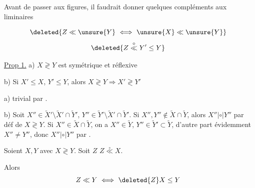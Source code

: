 
Avant de passer aux figures, il faudrait donner quelques compléments aux  liminaires


\[
\deleted{Z\ll\unsure{Y}\ \Longleftrightarrow\ \unsure{X}\ll\unsure{Y}}
\]
\[
\deleted{Z\overset{\circ}{\ll}Y'\leq Y}
\]
\noindent{}

\uline{Prop 1.} a) $X\gtrless Y$ est symétrique et réflexive

b) Si $X'\leq X$, $Y'\leq Y$, alors $X\gtrless Y\Longrightarrow X'\gtrless Y'$

 a)  trivial par .

b) Soit $X''\in\widetilde X'\setminus\widetilde X'\cap\widetilde Y'$, $Y''\in\widetilde Y'\setminus\widetilde X'\cap\widetilde Y'$.  Si $X'',Y''\notin\widetilde X\cap\widetilde Y$, alors $X''\mathrel{|\circ|}Y''$ par déf de $X\gtrless Y$. Si $X''\in\widetilde X\cap\widetilde Y$, on a $X''\in\widetilde Y$, $Y''\in\widetilde Y'\subset\widetilde Y$, d'autre part évidemment $X''\neq Y''$, donc $X''\mathrel{|\circ|}Y''$ par .


 Soient $X,Y$ avec $X\gtrless Y$. Soit $Z$  $Z\overset{\circ}{\ll}X$.

Alors
\[
Z\ll Y\ \Longleftrightarrow\ \deleted{Z}X\leq Y
\]

